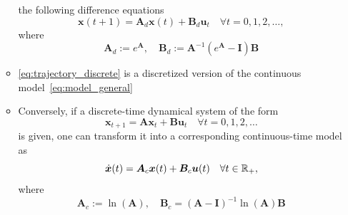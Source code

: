 \documentclass[12pt,a4paper]{article}
\begin{document}
\begin{itemize}
\begin{itemize}
    the following difference equations
    \begin{equation}\label{eq:trajectory_discrete}%
      \bm{x}(t+1)
      = \bm{A}_{d}\bm{x}(t)
      + \bm{B}_{d}\bm{u}_{t}
      \quad \forall t = 0, 1, 2, \ldots,
    \end{equation}
    where
    \begin{equation}\nonumber%
      \bm{A}_{d} := e^{\bm{A}},
      \quad
      \bm{B}_{d} := \bm{A}^{-1}(e^{\bm{A}}-\bm{I})\bm{B}
    \end{equation}
  \item \eqref{eq:trajectory_discrete}
    is a discretized version of the continuous model~\eqref{eq:model_general}
  \item Conversely, if a discrete-time dynamical system of the form
    \begin{equation}\nonumber%
      \bm{x}_{t+1} = \bm{A}\bm{x}_{t} + \bm{B}\bm{u}_{t} \quad \forall t = 0, 1, 2, \ldots
    \end{equation}
    is given,
    one can transform it into a corresponding continuous-time model as
    \begin{equation}\nonumber%
      \dot{\bm{x}}(t) = \bm{A}_{c}\bm{x}(t) + \bm{B}_{c}\bm{u}(t) \quad \forall t \in \R_{+},
    \end{equation}
    where
    \begin{equation}\nonumber%
      \bm{A}_{c} := \ln(\bm{A}),
      \quad
      \bm{B}_{c} = (\bm{A}-\bm{I})^{-1}\ln(\bm{A})\bm{B}
    \end{equation}
    
  \end{itemize}

\end{itemize}
\end{document}
